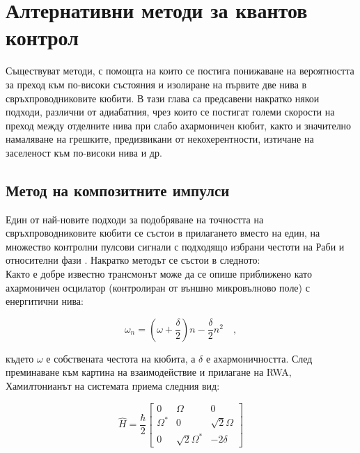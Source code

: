 \chapter{Алтернативни методи за квантов контрол} \nocite{gambetta2011analytic}

    Съществуват методи, с помощта на които се постига понижаване на вероятността за преход към по-високи състояния и изолиране на първите две нива в свръхпроводниковите кюбити.
    В тази глава са предсавени накратко някои подходи, различни от адиабатния, чрез които се постигат големи скорости на преход между отделните нива при слабо ахармоничен кюбит, както
    и значително намаляване на грешките, предизвикани от некохерентности, изтичане на заселеност към по-високи нива и др.

    \section{Метод на композитните импулси}

    Един от най-новите подходи за подобряване на точността на свръхпроводниковите кюбити се състои в прилагането вместо на един, на множество контролни пулсови сигнали с подходящо избрани
    честоти на Раби и относителни фази \cite{torosov2022fast}. Накратко методът се състои в следното: \\
    Както е добре известно трансмонът може да се опише приближено като ахармоничен осцилатор (контролиран от външно микровълново поле) с енергитични нива:

    \begin{equation}
        \omega_n = \left(\omega + \frac{\delta}{2}\right)n - \frac{\delta}{2}n^2 \quad,
    \end{equation}

    където $\omega$ е собствената честота на кюбита, а $\delta$ е ахармоничността. След преминаване към картина на взаимодействие и прилагане на RWA, Хамилтонианът на системата приема
    следния вид:

    \begin{equation} \label{4.2}
        \hat{H} = \frac{\hbar}{2}
        \begin{bmatrix}
            0 & \Omega & 0 \\
            \Omega^* & 0 & \sqrt{2}\Omega \\
            0 & \sqrt{2}\Omega^* & -2\delta
        \end{bmatrix}
    \end{equation}

